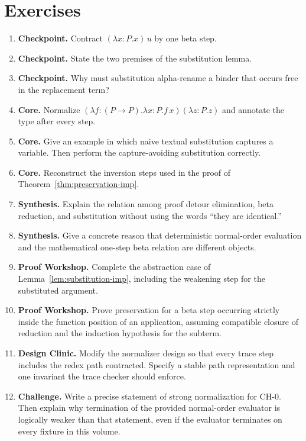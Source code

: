 \section*{Exercises}

\begin{enumerate}[label=\textbf{2.\arabic*.}]
\item \textbf{Checkpoint.} Contract $(\lambda x{:}P.x)\,u$ by one beta step.
\item \textbf{Checkpoint.} State the two premises of the substitution lemma.
\item \textbf{Checkpoint.} Why must substitution alpha-rename a binder that occurs free in the replacement term?
\item \textbf{Core.} Normalize $(\lambda f{:}(P\to P).\lambda x{:}P.f\,x)(\lambda z{:}P.z)$ and annotate the type after every step.
\item \textbf{Core.} Give an example in which naive textual substitution captures a variable. Then perform the capture-avoiding substitution correctly.
\item \textbf{Core.} Reconstruct the inversion steps used in the proof of Theorem~\ref{thm:preservation-imp}.
\item \textbf{Synthesis.} Explain the relation among proof detour elimination, beta reduction, and substitution without using the words “they are identical.”
\item \textbf{Synthesis.} Give a concrete reason that deterministic normal-order evaluation and the mathematical one-step beta relation are different objects.
\item \textbf{Proof Workshop.} Complete the abstraction case of Lemma~\ref{lem:substitution-imp}, including the weakening step for the substituted argument.
\item \textbf{Proof Workshop.} Prove preservation for a beta step occurring strictly inside the function position of an application, assuming compatible closure of reduction and the induction hypothesis for the subterm.
\item \textbf{Design Clinic.} Modify the normalizer design so that every trace step includes the redex path contracted. Specify a stable path representation and one invariant the trace checker should enforce.
\item \textbf{Challenge.} Write a precise statement of strong normalization for $\mathrm{CH}\text{-}0$. Then explain why termination of the provided normal-order evaluator is logically weaker than that statement, even if the evaluator terminates on every fixture in this volume.
\end{enumerate}
